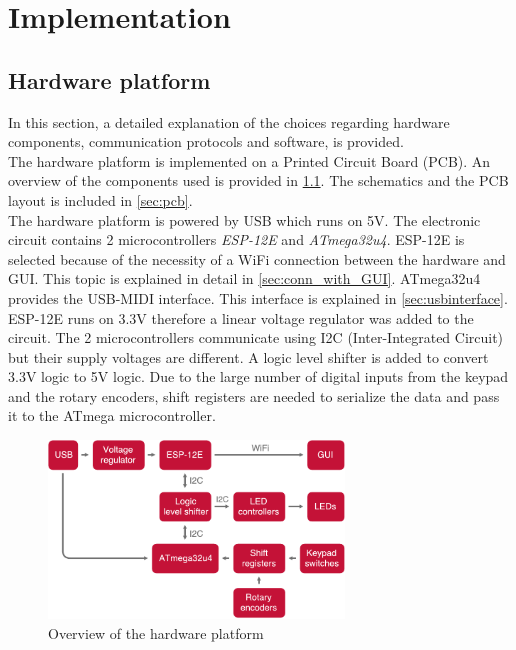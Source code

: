 \chapter{Implementation}

\section{Hardware platform}
In this section, a detailed explanation of the choices regarding hardware components, communication protocols and software, is provided.\\

The hardware platform is implemented on a Printed Circuit Board (PCB). An overview of the components used is provided in \cref{fig:hardware_overview}. The schematics and the PCB layout is included in \cref{sec:pcb}.\\
The hardware platform is powered by USB which runs on 5V. The electronic circuit contains 2 microcontrollers \textit{ESP-12E} and \textit{ATmega32u4}. ESP-12E is selected because of the necessity of a WiFi connection between the hardware and GUI. This topic is explained in detail in \cref{sec:conn_with_GUI}. ATmega32u4 provides the USB-MIDI interface. This interface is explained in \cref{sec:usbinterface}.\\
ESP-12E runs on 3.3V therefore a linear voltage regulator was added to the circuit. The 2 microcontrollers communicate using I2C (Inter-Integrated Circuit) but their supply voltages are different. A logic level shifter is added to convert 3.3V logic to 5V logic.
Due to the large number of digital inputs from the keypad and the rotary encoders, shift registers are needed to serialize the data and pass it to the ATmega microcontroller.

\begin{figure}[H]
    \centering
    \includegraphics[width=0.7\textwidth]{graphics/hardware_overview.pdf}
    \caption{Overview of the hardware platform}
    \label{fig:hardware_overview}
\end{figure}


